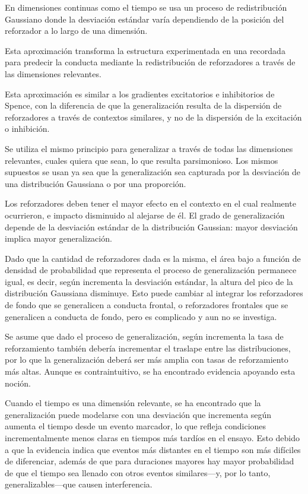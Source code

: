 \documentclass[a4paper,12pt]{article}
\begin{document}
En dimensiones continuas como el tiempo se usa un proceso de redistribución Gaussiano donde la desviación estándar varía dependiendo de la posición del reforzador a lo largo de una dimensión.

Esta aproximación transforma la estructura experimentada en una recordada para predecir la conducta mediante la redistribución de reforzadores a través de las dimensiones relevantes.

Esta aproximación es similar a los gradientes excitatorios e inhibitorios de Spence, con la diferencia de que la generalización resulta de la dispersión de reforzadores a través de contextos similares, y no de la dispersión de la excitación o inhibición.

Se utiliza el mismo principio para generalizar a través de todas las dimensiones relevantes, cuales quiera que sean, lo que resulta parsimonioso. Los mismos supuestos se usan ya sea que la generalización sea capturada por la desviación de una distribución Gaussiana o por una proporción.

Los reforzadores deben tener el mayor efecto en el contexto en el cual realmente ocurrieron, e impacto disminuido al alejarse de él. El grado de generalización depende de la desviación estándar de la distribución Gaussian: mayor desviación implica mayor generalización.

Dado que la cantidad de reforzadores dada es la misma, el área bajo a función de densidad de probabilidad que representa el proceso de generalización permanece igual, es decir, según incrementa la desviación estándar, la altura del pico de la distribución Gaussiana disminuye. Esto puede cambiar al integrar los reforzadores de fondo que se generalicen a conducta frontal, o reforzadores frontales que se generalicen a conducta de fondo, pero es complicado y aun no se investiga.

Se asume que dado el proceso de generalización, según incrementa la tasa de reforzamiento también debería incrementar el traslape entre las distribuciones, por lo que la generalización deberá ser más amplia con tasas de reforzamiento más altas. Aunque es contraintuitivo, se ha encontrado evidencia apoyando esta noción.

Cuando el tiempo es una dimensión relevante, se ha encontrado que la generalización puede modelarse con una desviación que incrementa según aumenta el tiempo desde un evento marcador, lo que refleja condiciones incrementalmente menos claras en tiempos más tardíos en el ensayo. Esto debido a que la evidencia indica que eventos más distantes en el tiempo son más difíciles de diferenciar, además de que para duraciones mayores hay mayor probabilidad de que el tiempo sea llenado con otros eventos similares---y, por lo tanto, generalizables---que causen interferencia.
\end{document}
